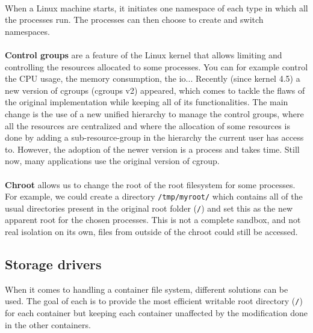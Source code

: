 \paragraph{}When a Linux machine starts, it initiates one namespace of each type in which all the processes run.  The processes can then choose to create and switch namespaces.

\paragraph{}\textbf{Control groups} are a feature of the Linux kernel that allows limiting and controlling the resources allocated to some processes.  You can for example control the CPU usage, the memory consumption, the io...  Recently (since kernel 4.5) a new version of cgroups (cgroups v2) appeared, which comes to tackle the flaws of the original implementation while keeping all of its functionalities.  The main change is the use of a new unified hierarchy to manage the control groups, where all the resources are centralized and where the allocation of some resources is done by adding a sub-resource-group in the hierarchy the current user has access to.
However, the adoption of the newer version is a process and takes time. Still now, many applications use the original version of cgroup.

\paragraph{}\textbf{Chroot} allows us to change the root of the root filesystem for some processes.  For example, we could create a directory \texttt{/tmp/myroot/} which contains all of the usual directories present in the original root folder (\texttt{/}) and set this as the new apparent root for the chosen processes.  This is not a complete sandbox, and not real isolation on its own, files from outside of the chroot could still be accessed.

\subsection{Storage drivers}
When it comes to handling a container file system, different solutions can be used.  The goal of each is to provide the most efficient writable root directory (\texttt{/}) for each container but keeping each container unaffected by the modification done in the other containers.

